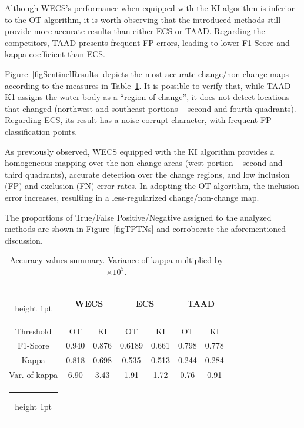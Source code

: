 \documentclass[journal]{IEEEtran}
\makeatletter
\newcommand{\thickhline}{\noalign {\ifnum 0=`}\fi \hrule height 1pt \futurelet \reserved@a \@xhline}
\makeatother
\begin{document}
Although WECS's performance when equipped with the KI algorithm is inferior to the OT algorithm, it is worth observing that the introduced methods still provide more accurate results than either ECS or TAAD.
Regarding the competitors, TAAD presents frequent FP errors, leading to lower F1-Score and kappa coefficient than ECS.



Figure~\ref{figSentinelResults} depicts the most accurate change/non-change maps according to the measures in Table~\ref{tabAccExpSentinel}.
It is possible to verify that, while TAAD-K1 assigns the water body as a ``region of change'', it does not detect locations that changed (northwest and southeast portions -- second and fourth quadrants).
Regarding ECS, its result has a noise-corrupt character, with frequent FP classification points.

As previously observed, WECS equipped with the KI algorithm provides a homogeneous mapping over the non-change areas (west portion -- second and third quadrants), accurate detection over the change regions, and low inclusion (FP) and exclusion (FN) error rates. In adopting the OT algorithm, the inclusion error increases, resulting in a less-regularized change/non-change map.

The proportions of True/False Positive/Negative assigned to the analyzed methods are shown in Figure~\ref{figTPTNs} and corroborate the aforementioned discussion.




\begin{table}[H]
\caption{Accuracy values summary. Variance of kappa multiplied by $\times 10^{5}$.}\label{tabAccExpSentinel}
\centering
\begin{tabular}{ccccccc}
\thickhline
 & \multicolumn{2}{c}{\textbf{WECS}} & \multicolumn{2}{c}{\textbf{ECS}} & \multicolumn{2}{c}{\textbf{TAAD}}\tabularnewline
Threshold & OT & KI & OT & KI & OT & KI\tabularnewline
\hline 
F1-Score & 0.940 & 0.876 & 0.6189 & 0.661 & 0.798 & 0.778\tabularnewline
Kappa & 0.818 & 0.698 & 0.535 & 0.513 & 0.244 & 0.284\tabularnewline
Var. of kappa & 6.90 & 3.43 & 1.91 & 1.72 & 0.76 & 0.91 \tabularnewline
\thickhline
\end{tabular}
\end{table}
\end{document}
